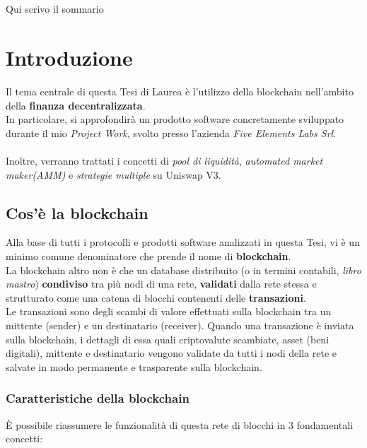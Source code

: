 \documentclass[12pt,a4paper]{report}
\makeatletter
\renewenvironment{abstract}{%
    \if@twocolumn
      \section*{\abstractname}%
    \else
      \begin{center}%
        {\bfseries \Large\abstractname\vspace{\z@}}
      \end{center}%
      \quotation
    \fi}
    {\if@twocolumn\else\endquotation\fi}
\makeatother
\begin{document}
\begin{abstract}
   Qui scrivo il sommario
\end{abstract}
\tableofcontents






\chapter{Introduzione}

\noindent Il tema centrale di questa Tesi di Laurea è l'utilizzo della blockchain nell'ambito della \textbf{finanza decentralizzata}.\\ In particolare, si approfondirà un prodotto software concretamente sviluppato durante il mio  \textit{Project Work}, svolto presso l'azienda \textit{Five Elements Labs Srl}.
\\\\Inoltre, verranno trattati i concetti di \textit{pool di liquidità}, \textit{automated market maker(AMM)} e \textit{strategie multiple} su Uniswap V3.

\section{Cos'è la blockchain}

Alla base di tutti i protocolli e prodotti software analizzati in questa Tesi, vi è un minimo comune denominatore che prende il nome di \textbf{blockchain}\cite{blockchain}.
\\La blockchain altro non è che un database distribuito (o in termini contabili, \textit{libro mastro}) \textbf{condiviso} tra più nodi di una rete, \textbf{validati} dalla rete stessa e strutturato come una catena di blocchi contenenti delle \textbf{transazioni}.
\\Le transazioni sono degli scambi di valore effettuati sulla blockchain tra un mittente (sender) e un destinatario (receiver).
Quando una transazione è inviata sulla blockchain, i dettagli di essa quali criptovalute scambiate, asset (beni digitali), mittente e destinatario vengono validate da tutti i nodi della rete e salvate in modo permanente e trasparente sulla blockchain.


\subsection{Caratteristiche della blockchain}

È possibile riassumere le funzionalità di questa rete di blocchi in 3 fondamentali concetti:
\end{document}
